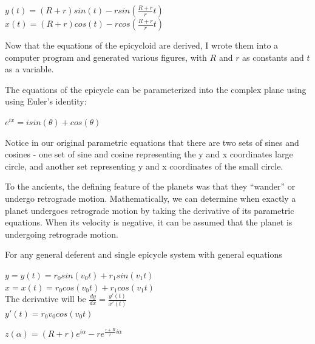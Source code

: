 \begin{centering}
$y(t) = (R+r)sin(t) - rsin(\frac{R+r}{r}t)$ \\ 
$x(t) = (R+r)cos(t) - rcos(\frac{R+r}{r}t)$ \\ 
\end{centering}

Now that the equations of the epicycloid are derived, I wrote them into a computer program and generated various figures, with $R$ and $r$ as constants and $t$ as a variable. 


The equations of the epicycle can be parameterized into the complex plane using using Euler's identity:

\begin{centering}
$e^{ix} = isin(\theta) + cos(\theta)$
\end{centering}

Notice in our original parametric equations that there are two sets of sines and cosines - one set of sine and cosine representing the y and x coordinates large circle, and another set representing y and x coordinates of the small circle.


To the ancients, the defining feature of the planets was that they ``wander'' or undergo retrograde motion. Mathematically, we can determine when exactly a planet undergoes retrograde motion by taking the derivative of its parametric equations. When its velocity is negative, it can be assumed that the planet is undergoing retrograde motion.

For any general deferent and single epicycle system with general equations

$y = y(t) = r_{0}sin(v_{0}t) + r_{1}sin(v_{1}t)$ \\
$x = x(t) = r_{0}cos(v_{0}t) + r_{1}cos(v_{1}t)$ \\ 

The derivative will be 
$ \frac{dy}{dx} = \frac{y'(t)}{x'(t)}$ \\
$ y'(t) = r_{0}v_{0}cos(v_{0}t) $



\begin{centering}
$z(\alpha) = (R+r)e^{i\alpha}-re^{\frac{r+R}{r}i\alpha}$
\end{centering}